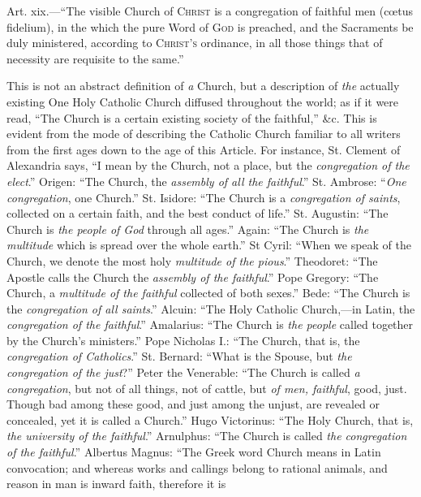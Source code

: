 
Art. xix.—``The visible Church of C\textsc{hrist}
is a congregation of faithful men (cœtus fidelium), in the which the
pure Word of G\textsc{od} is preached, and the Sacraments
be duly ministered, according to C\textsc{hrist's}
ordinance, in all those things that of necessity are requisite to the
same.''

This is not an abstract definition of \emph{a} Church, but a
description of \emph{the} actually existing One Holy Catholic Church
diffused throughout the world; as if it were read, ``The Church is
a certain existing society of the faithful,'' \&c. This is
evident from the mode of describing the Catholic Church familiar to
all writers from the first ages down to the age of this Article. For
instance, St. Clement of Alexandria says, ``I mean by the Church,
not a place, but the \emph{congregation of the elect}.'' Origen:
``The Church, the \emph{assembly of all the faithful}.'' St.
Ambrose: ``\emph{One congregation}, one Church.'' St. Isidore:
``The Church is a \emph{congregation of saints}, collected on a
certain faith, and the best conduct of life.'' St. Augustin:
``The Church is \emph{the people of God} through all ages.''
Again: ``The Church is \emph{the multitude} which is spread over
the whole earth.'' St Cyril: ``When we speak of the Church, we
denote the most holy \emph{multitude of the pious}.'' Theodoret:
``The Apostle calls the Church the \emph{assembly of the faithful}.''
Pope Gregory: ``The Church, a \emph{multitude of the faithful}
collected of both sexes.'' Bede: ``The Church is the \emph{congregation
of all saints}.'' Alcuin: ``The Holy Catholic Church,—in
Latin, the \emph{congregation of the faithful}.'' Amalarius:
``The Church is \emph{the people} called together by the Church's
ministers.'' Pope Nicholas I.: ``The Church, that is, the \emph{congregation
of Catholics}.'' St. Bernard: ``What is the Spouse, but \emph{the
congregation of the just}?'' Peter the Venerable: ``The
Church is called \emph{a congregation}, but not of all things,
not of cattle, but \emph{of men, faithful}, good, just. Though bad
among these good, and just among the unjust, are revealed or
concealed, yet it is called a Church.'' Hugo Victorinus: ``The
Holy Church, that is, \emph{the university of the faithful}.''
Arnulphus: ``The Church is called \emph{the congregation of the
faithful}.'' Albertus Magnus: ``The Greek word Church means
in Latin convocation; and whereas works and callings belong to
rational animals, and reason in man is inward faith, therefore it is
